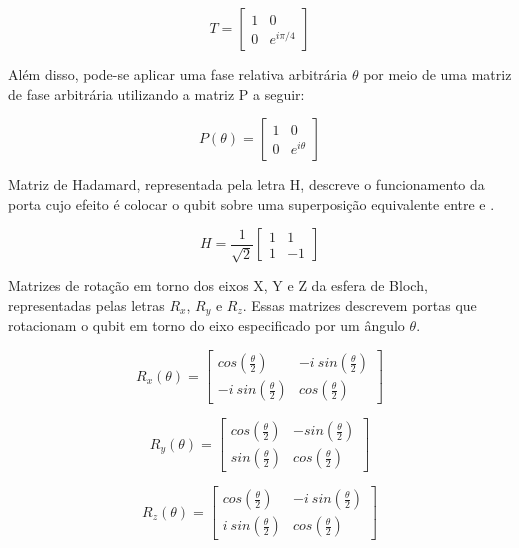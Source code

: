 \begin{equation}
  T = \begin{bmatrix}
    1 & 0 \\
    0 & e^{i\pi/4}
  \end{bmatrix}
\end{equation}

Além disso, pode-se aplicar uma fase relativa arbitrária $\theta$ por meio de uma matriz de fase arbitrária utilizando a matriz P a seguir:

\begin{equation}
  P(\theta) = \begin{bmatrix}
    1 & 0 \\
    0 & e^{i\theta}
  \end{bmatrix}
\end{equation}

Matriz de Hadamard, representada pela letra H, descreve o funcionamento da porta cujo efeito é colocar o qubit sobre uma superposição equivalente entre  e .

\begin{equation}
  H = \frac{1}{\sqrt{2}} \begin{bmatrix}
    1 & 1 \\
    1 & -1
  \end{bmatrix}
\end{equation}

Matrizes de rotação em torno dos eixos X, Y e Z da esfera de Bloch, representadas pelas letras $R_x$, $R_y$ e $R_z$. Essas matrizes descrevem portas que rotacionam o qubit em torno do eixo especificado por um ângulo $\theta$.

\begin{equation}
  R_x(\theta) = \begin{bmatrix}
    cos(\frac{\theta}{2}) & -i\ sin(\frac{\theta}{2}) \\
    -i\ sin(\frac{\theta}{2}) & cos(\frac{\theta}{2})
  \end{bmatrix}
\end{equation}

\begin{equation}
  R_y(\theta) = \begin{bmatrix}
      cos(\frac{\theta}{2}) & -sin(\frac{\theta}{2}) \\
      sin(\frac{\theta}{2}) & cos(\frac{\theta}{2})
  \end{bmatrix}
\end{equation}

\begin{equation}
  R_z(\theta) = \begin{bmatrix}
      cos(\frac{\theta}{2}) & -i\ sin(\frac{\theta}{2}) \\
      i\ sin(\frac{\theta}{2}) & cos(\frac{\theta}{2})
  \end{bmatrix}
\end{equation}

